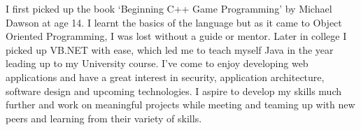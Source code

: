 
\begin{cvparagraph}
    {I first picked up the book `Beginning C++ Game Programming' by Michael Dawson at age 14. I learnt the basics of the language but as it came to Object Oriented Programming, I was lost without a guide or mentor. Later in college I picked up VB.NET with ease, which led me to teach myself Java in the year leading up to my University course. I've come to enjoy developing web applications and have a great interest in security, application architecture, software design and upcoming technologies. I aspire to develop my skills much further and work on meaningful projects while meeting and teaming up with new peers and learning from their variety of skills.}
\end{cvparagraph}
